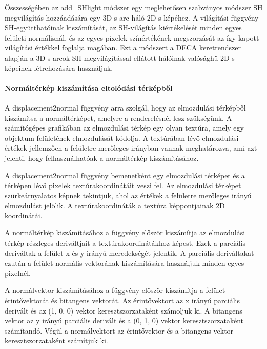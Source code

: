 \documentclass[12pt,a4]{article}
\begin{document}
            Összességében az add\_SHlight módszer egy meglehetősen szabványos módszer SH megvilágítás hozzáadására egy 3D-s arc háló 2D-s képéhez. A világítási függvény SH-együtthatóinak kiszámítását, 
            az SH-világítás kiértékelését minden egyes felületi normálisnál, és az egyes pixelek színértékének megszorzását az így kapott világítási értékkel foglalja magában. 
            Ezt a módszert a DECA keretrendszer alapján a 3D-s arcok SH megvilágítással ellátott hálóinak valósághű 2D-s képeinek létrehozására használjuk.

        \paragraph{Normáltérkép kiszámítása eltolódási térképből}

            A displacement2normal függvény arra szolgál, hogy az elmozdulási térképből kiszámítsa a normáltérképet, amelyre a renderelésnél lesz szükségünk. 
            A számítógépes grafikában az elmozdulási térkép egy olyan textúra, amely egy objektum felületének elmozdulását kódolja.
            A textúrában lévő elmozdulási értékek jellemzően a felületre merőleges irányban vannak meghatározva, ami azt jelenti, hogy felhasználhatóak a normáltérkép kiszámításához.
            
            A displacement2normal függvény bemenetként egy elmozdulási térképet és a térképen lévő pixelek textúrakoordinátáit veszi fel. 
            Az elmozdulási térképet szürkeárnyalatos képnek tekintjük, ahol az értékek a felületre merőleges irányú elmozdulást jelölik.
            A textúrakoordináták a textúra képpontjainak 2D koordinátái.
            
            A normáltérkép kiszámításához a függvény először kiszámítja az elmozdulási térkép részleges deriváltjait a textúrakoordinátákhoz képest.
            Ezek a parciális deriváltak a felület x és y irányú meredekségét jelentik. A parciális deriváltakat ezután a felület normális vektorának kiszámítására használjuk minden egyes pixelnél.
            
            A normálvektor kiszámításához a függvény először kiszámítja a felület érintővektorát és bitangens vektorát.
            Az érintővektort az x irányú parciális derivált és az (1, 0, 0) vektor keresztszorzataként számoljuk ki. 
            A bitangens vektor az y irányú parciális derivált és a (0, 1, 0) vektor keresztszorzataként számítandó. 
            Végül a normálvektort az érintővektor és a bitangens vektor keresztszorzataként számítjuk ki.
            
\end{document}
